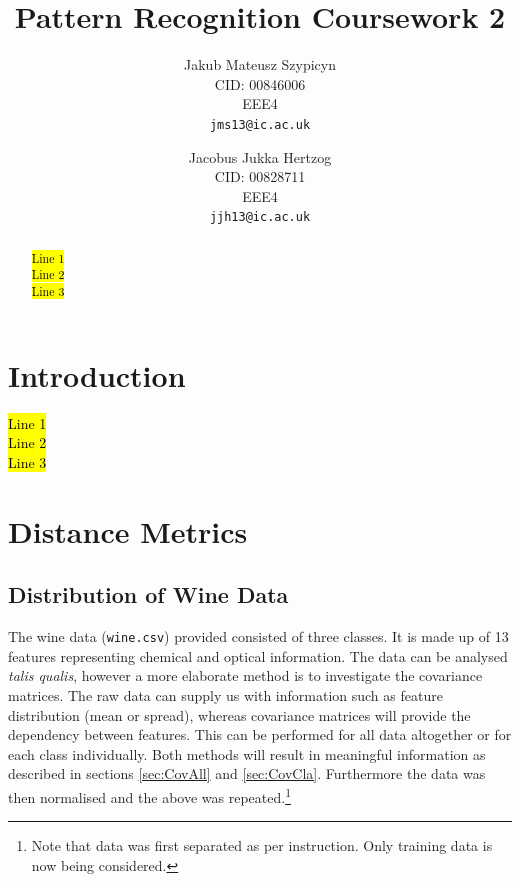 \documentclass[10pt,twocolumn,letterpaper]{article}
\begin{document}
\title{Pattern Recognition Coursework 2}

\author{Jakub Mateusz Szypicyn\\
CID: 00846006\\
EEE4\\
{\tt\small jms13@ic.ac.uk}
\and
Jacobus Jukka Hertzog\\
CID: 00828711\\
EEE4\\
{\tt\small jjh13@ic.ac.uk}
}

\maketitle

\begin{abstract}
\hl{Line 1\\

Line 2\\

Line 3\\}
\end{abstract}

\section{Introduction}
\hl{Line 1\\

Line 2\\

Line 3\\}
\section{Distance Metrics}
\subsection{Distribution of Wine Data}

The wine data ({\tt\small wine.csv}) provided consisted of three classes. It is made up of 13 features representing chemical and optical information. The data can be analysed \textit{talis qualis}, however a more elaborate method is to investigate the covariance matrices. The raw data can supply us with information such as feature distribution (mean or spread), whereas covariance matrices will provide the dependency between features. This can be performed for all data altogether or for each class individually. Both methods will result in meaningful information as described in sections \ref{sec:CovAll} and \ref{sec:CovCla}. Furthermore the data was then normalised and the above was repeated.\footnote{Note that data was first separated as per instruction. Only training data is now being considered.} 
\end{document}
